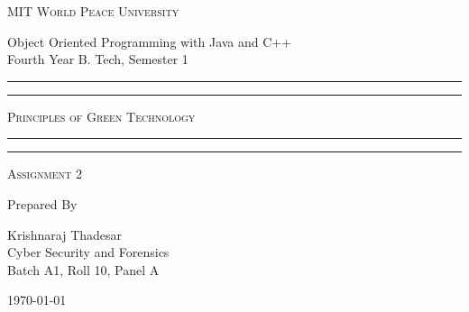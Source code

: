 \documentclass[11pt]{article}
\begin{document}
\begin{titlepage}
	\centering


	\huge\textsc{
		MIT World Peace University
	}\\

	\vspace{0.75\baselineskip} %

	\LARGE{
		Object Oriented Programming with Java and C++\\
		Fourth Year B. Tech, Semester 1
	}

	\vfill %


	\rule{\textwidth}{1.6pt}\vspace*{-\baselineskip}\vspace*{2pt}
	\rule{\textwidth}{0.6pt}
	\vspace{0.75\baselineskip} %



	\huge{\textsc{
			Principles of Green Technology
		}} \\



	\vspace{0.5\baselineskip} %
	\rule{\textwidth}{0.6pt}\vspace*{-\baselineskip}\vspace*{2.8pt}
	\rule{\textwidth}{1.6pt}

	\vspace{1\baselineskip} %


	\LARGE\textsc{
		Assignment 2
	} %
	\vfill


	Prepared By
	\vspace{0.5\baselineskip} %

	\Large{
		Krishnaraj Thadesar \\
		Cyber Security and Forensics\\
		Batch A1, Roll 10, Panel A
	}


	\vspace{0.5\baselineskip} %
	\today

\end{titlepage}
\end{document}
